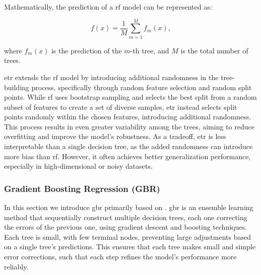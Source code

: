 Mathematically, the prediction of a \gls{rf} model can be represented as:

$$
f(x) = \frac{1}{M} \sum_{m=1}^{M} f_m(x),
$$

where $f_m(x)$ is the prediction of the $m$-th tree, and $M$ is the total number of trees.

\gls{etr} extends the \gls{rf} model by introducing additional randomness in the tree-building process, specifically through random feature selection and random split points.
While \gls{rf} uses bootstrap sampling and selects the best split from a random subset of features to create a set of diverse samples, \gls{etr} instead selects split points randomly within the chosen features, introducing additional randomness.
This process results in even greater variability among the trees, aiming to reduce overfitting and improve the model's robustness.
As a tradeoff, \gls{etr} is less interpretable than a single decision tree, as the added randomness can introduce more bias than \gls{rf}.
However, it often achieves better generalization performance, especially in high-dimensional or noisy datasets.

\subsubsection{Gradient Boosting Regression (GBR)}\label{sec:gradientboost}
In this section we introduce \gls{gbr} primarily based on \citet{James2023AnIS}.
\gls{gbr} is an ensemble learning method that sequentially construct multiple decision trees, each one correcting the errors of the previous one, using gradient descent and boosting techniques.
Each tree is small, with few terminal nodes, preventing large adjustments based on a single tree's predictions.
This ensures that each tree makes small and simple error corrections, such that each step refines the model's performance more reliably.

